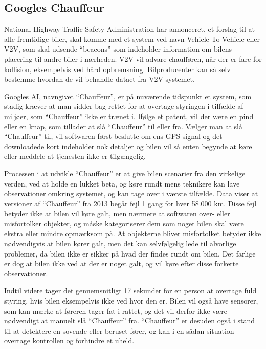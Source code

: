 \subsection{Googles Chauffeur}

National Highway Traffic Safety Administration har annonceret, et forslag til at alle fremtidige biler, skal komme med et system ved navn Vehicle To Vehicle eller V2V, som skal udsende ``beacons'' som indeholder information om bilens placering til andre biler i nærheden. V2V vil advare chaufføren, når der er fare for kollision, eksempelvis ved hård opbremsning. Bilproducenter kan så selv bestemme hvordan de vil behandle dataet fra V2V-systemet.\cite{V2V}

Googles AI, navngivet ``Chauffeur'', er på nuværende tidspunkt et system, som stadig kræver at man sidder bag rettet for at overtage styringen i tilfælde af miljøer, som ``Chauffeur'' ikke er trænet i. Ifølge et patent, vil der være en pind eller en knap, som tillader at slå ``Chauffeur'' til eller fra. Vælger man at slå ``Chauffeur'' til, vil softwaren først beslutte om ens GPS signal og det downloadede kort indeholder nok detaljer og bilen vil så enten begynde at køre eller meddele at tjenesten ikke er tilgængelig.\cite{GooglePatent}

Processen i at udvikle ``Chauffeur'' er at give bilen scenarier fra den virkelige verden, ved at holde en lukket beta, og køre rundt mens teknikere kan lave observationer omkring systemet, og kan tage over i værste tilfælde. Data viser at versioner af ``Chauffeur'' fra 2013 begår fejl 1 gang for hver 58.000 km\cite{PopSci}. Disse fejl betyder ikke at bilen vil køre galt, men nærmere at softwaren over- eller misfortolker objekter, og måske kategoriserer dem som noget bilen skal være ekstra eller mindre opmærksom på. At objekterne bliver misfortolket betyder ikke nødvendigvis at bilen kører galt, men det kan selvfølgelig lede til alvorlige problemer, da bilen ikke er sikker på hvad der findes rundt om bilen. Det farlige er dog at bilen ikke ved at der er noget galt, og vil køre efter disse forkerte observationer.

Indtil videre tager det gennemsnitligt 17 sekunder for en person at overtage fuld styring, hvis bilen eksempelvis ikke ved hvor den er. Bilen vil også have sensorer, som kan mærke at føreren tager fat i rattet, og det vil derfor ikke være nødvendigt at manuelt slå ``Chauffeur'' fra. ``Chauffeur'' er desuden også i stand til at detektere en sovende eller beruset fører, og kan i en sådan situation overtage kontrollen og forhindre et uheld.\cite{GooglePatent}

